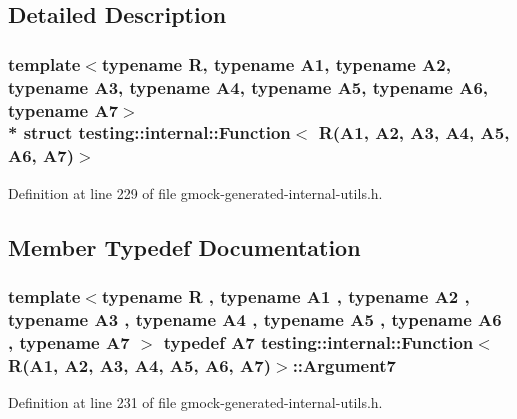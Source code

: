 \subsection{Detailed Description}
\subsubsection*{template$<$typename R, typename A1, typename A2, typename A3, typename A4, typename A5, typename A6, typename A7$>$\\*
struct testing\+::internal\+::\+Function$<$ R(\+A1, A2, A3, A4, A5, A6, A7)$>$}



Definition at line 229 of file gmock-\/generated-\/internal-\/utils.\+h.



\subsection{Member Typedef Documentation}
\subsubsection[{\texorpdfstring{Argument7}{Argument7}}]{\setlength{\rightskip}{0pt plus 5cm}template$<$typename R , typename A1 , typename A2 , typename A3 , typename A4 , typename A5 , typename A6 , typename A7 $>$ typedef A7 {\bf testing\+::internal\+::\+Function}$<$ {\bf R}(A1, A2, A3, A4, A5, A6, A7)$>$\+::{\bf Argument7}}\hypertarget{structtesting_1_1internal_1_1_function_3_01_r_07_a1_00_01_a2_00_01_a3_00_01_a4_00_01_a5_00_01_a6_00_01_a7_08_4_a55fa91035fc3c9da4c6ab94060ca6f6f}{}\label{structtesting_1_1internal_1_1_function_3_01_r_07_a1_00_01_a2_00_01_a3_00_01_a4_00_01_a5_00_01_a6_00_01_a7_08_4_a55fa91035fc3c9da4c6ab94060ca6f6f}


Definition at line 231 of file gmock-\/generated-\/internal-\/utils.\+h.

